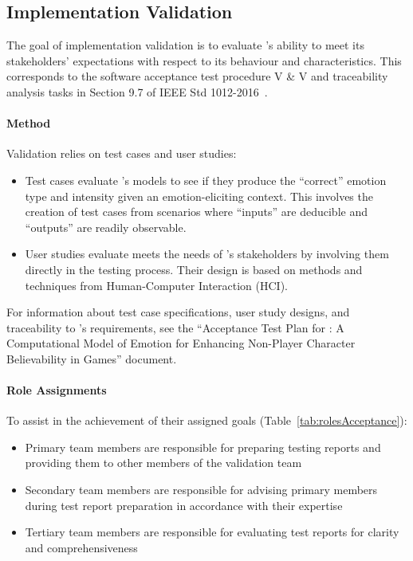 \subsection{Implementation Validation}\label{plan:validate}
The goal of implementation validation is to evaluate \progname{}'s ability to
meet its stakeholders' expectations with respect to its behaviour and
characteristics. This corresponds to the software acceptance test procedure V
\& V and traceability analysis tasks in Section 9.7 of IEEE Std
1012-2016~\citep{vvIEEE}.

\paragraph{Method} Validation relies on test cases and user studies:
\begin{itemize}

    \item Test cases evaluate \progname{}'s models to see if they produce the
    ``correct'' emotion type and intensity given an emotion-eliciting context.
    This involves the creation of test cases from scenarios where ``inputs''
    are deducible and ``outputs'' are readily observable.

    \item User studies evaluate meets the needs of \progname{}'s stakeholders
    by involving them directly in the testing process. Their design is based on
    methods and techniques from Human-Computer Interaction (HCI).

\end{itemize}

For information about test case specifications, user study designs, and
traceability to \progname{}'s requirements, see the ``Acceptance Test Plan for
\progname{}: A Computational Model of Emotion for Enhancing Non-Player
Character Believability in Games'' document.

\paragraph{Role Assignments} To assist in the achievement of their
assigned goals (Table~\ref{tab:rolesAcceptance}):
\begin{itemize}

    \item Primary team members are responsible for preparing testing reports
    and providing them to other members of the validation team

    \item Secondary team members are responsible for advising primary members
    during test report preparation in accordance with their expertise

    \item Tertiary team members are responsible for evaluating test reports for
    clarity and comprehensiveness

\end{itemize}

